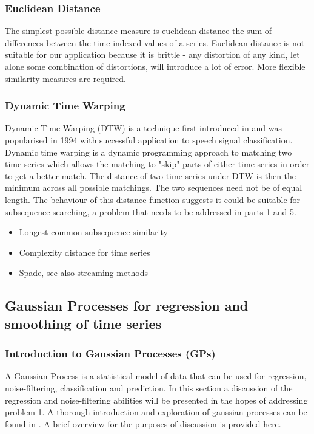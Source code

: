 \documentclass[11pt]{article}
\begin{document}
	\subsubsection{Euclidean Distance}
	The simplest possible distance measure is euclidean distance the sum of differences between the time-indexed values of a series. Euclidean distance is not suitable for our application because it is brittle - any distortion of any kind, let alone some combination of distortions, will introduce a lot of error. More flexible similarity measures are required.
	\subsubsection{Dynamic Time Warping}
	Dynamic Time Warping (DTW) is a technique first introduced in \citep{sakoe1978dynamic} and was popularised in 1994 \citep{berndt1994using} with successful application to speech signal classification. Dynamic time warping is a dynamic programming approach to matching two time series which allows the matching to "skip" parts of either time series in order to get a better match. The distance of two time series under DTW is then the minimum across all possible matchings. The two sequences need not be of equal length. The behaviour of this distance function suggests it could be suitable for subsequence searching, a problem that needs to be addressed in parts 1 and 5.
	\begin{itemize}
		\item Longest common subsequence similarity
		\item Complexity distance for time series \citep{batista2011complexity}
		\item Spade, see also streaming methods
	\end{itemize}

	\subsection{Gaussian Processes for regression and smoothing of time series}
	\subsubsection{Introduction to Gaussian Processes (GPs)}
	A Gaussian Process is a statistical model of data that can be used for regression, noise-filtering, classification and prediction. In this section a discussion of the regression and noise-filtering abilities will be presented in the hopes of addressing problem 1. A thorough introduction and exploration of gaussian processes can be found in \citep{rasmussen2006gpfml}. A brief overview for the purposes of discussion is provided here.
\end{document}

